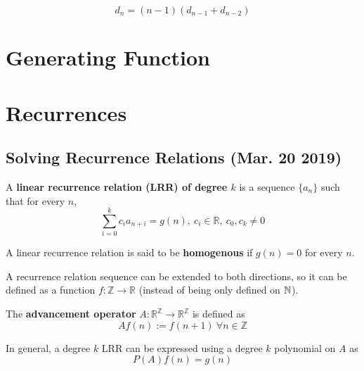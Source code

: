 \documentclass{article}
\def\Z{{\mathbb Z}}
\def\R{{\mathbb R}}
\begin{document}
				\begin{proposition}
					\begin{equation}
						d_n = (n-1)(d_{n-1} + d_{n-2})
					\end{equation}
				\end{proposition}
				
		\section{Generating Function}


		\section{Recurrences}
			\subsection{Solving Recurrence Relations (Mar. 20 2019)}
				\begin{definition}
					A \textbf{linear recurrence relation (LRR) of degree $k$} is a sequence $\{a_n\}$ such that for every $n$, 
					\begin{equation}
						\sum_{i=0}^k c_i a_{n+i} = g(n),\ c_i \in \R,\ c_0, c_k \neq 0
					\end{equation}
				\end{definition}
				
				\begin{definition}
					A linear recurrence relation is said to be \textbf{homogenous} if $g(n) = 0$ for every $n$.
				\end{definition}
				
				\begin{remark}
					A recurrence relation sequence can be extended to both directions, so it can be defined as a function $f: \Z \to \R$ (instead of being only defined on $\mathbb{N}$).
				\end{remark}
				
				\begin{definition}
					The \textbf{advancement operator} $A: \R^{\Z} \to \R^{\Z}$ is defined as
					\begin{equation}
						A f(n) := f(n+1)\ \forall n \in \Z
					\end{equation}
				\end{definition}
				
				\begin{proposition}
					In general, a degree $k$ LRR can be expressed using a degree $k$ polynomial on $A$ as
					\begin{equation}
						P(A) f(n) = g(n)
					\end{equation}
				\end{proposition}
				
\end{document}
